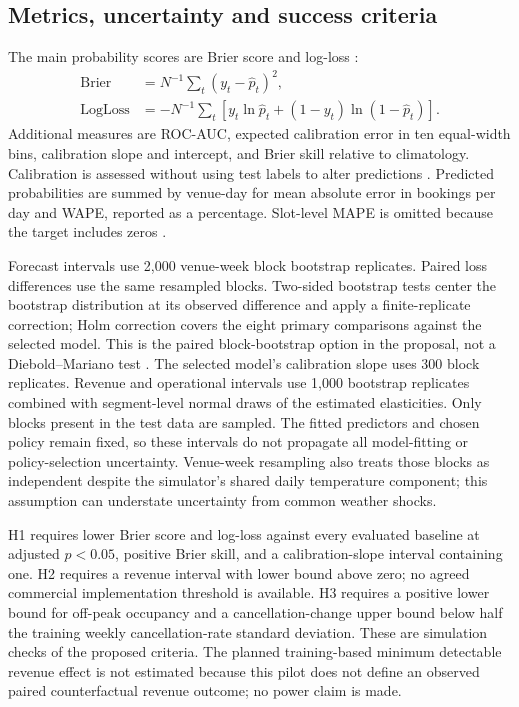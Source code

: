 \subsection{Metrics, uncertainty and success criteria}
The main probability scores are Brier score and log-loss \cite{m21,m22}:
\begin{align}
 \mathrm{Brier}&=N^{-1}\sum_t(y_t-\widehat p_t)^2,\\
 \mathrm{LogLoss}&=-N^{-1}\sum_t[y_t\ln\widehat p_t+(1-y_t)\ln(1-\widehat p_t)].
\end{align}
Additional measures are ROC-AUC, expected calibration error in ten equal-width bins, calibration slope and intercept, and Brier skill relative to climatology. Calibration is assessed without using test labels to alter predictions \cite{m24}. Predicted probabilities are summed by venue-day for mean absolute error in bookings per day and WAPE, reported as a percentage. Slot-level MAPE is omitted because the target includes zeros \cite{m23}.

Forecast intervals use 2,000 venue-week block bootstrap replicates. Paired loss differences use the same resampled blocks. Two-sided bootstrap tests center the bootstrap distribution at its observed difference and apply a finite-replicate correction; Holm correction covers the eight primary comparisons against the selected model. This is the paired block-bootstrap option in the proposal, not a Diebold--Mariano test \cite{m26}. The selected model's calibration slope uses 300 block replicates. Revenue and operational intervals use 1,000 bootstrap replicates combined with segment-level normal draws of the estimated elasticities. Only blocks present in the test data are sampled. The fitted predictors and chosen policy remain fixed, so these intervals do not propagate all model-fitting or policy-selection uncertainty. Venue-week resampling also treats those blocks as independent despite the simulator's shared daily temperature component; this assumption can understate uncertainty from common weather shocks.

H1 requires lower Brier score and log-loss against every evaluated baseline at adjusted $p<0.05$, positive Brier skill, and a calibration-slope interval containing one. H2 requires a revenue interval with lower bound above zero; no agreed commercial implementation threshold is available. H3 requires a positive lower bound for off-peak occupancy and a cancellation-change upper bound below half the training weekly cancellation-rate standard deviation. These are simulation checks of the proposed criteria. The planned training-based minimum detectable revenue effect is not estimated because this pilot does not define an observed paired counterfactual revenue outcome; no power claim is made.

